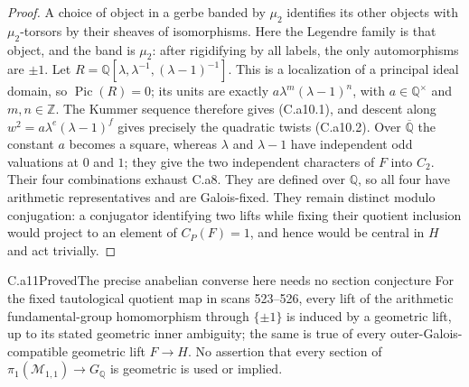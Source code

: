 \begin{proof}
A choice of object in a gerbe banded by $\mu_2$ identifies its other
objects with $\mu_2$-torsors by their sheaves of isomorphisms. Here the
Legendre family is that object, and the band is $\mu_2$: after rigidifying
by all labels, the only automorphisms are $\pm1$. Let
$R=\mathbb Q[\lambda,\lambda^{-1},(\lambda-1)^{-1}]$. This is a
localization of a principal ideal domain, so $\operatorname{Pic}(R)=0$;
its units are exactly $a\lambda^m(\lambda-1)^n$, with
$a\in\mathbb Q^{\times}$ and $m,n\in\mathbb Z$. The Kummer sequence
therefore gives (C.a10.1), and descent along $w^2=a\lambda^e
(\lambda-1)^f$ gives precisely the quadratic twists (C.a10.2).
Over $\overline{\mathbb Q}$ the constant $a$ becomes a square, whereas
$\lambda$ and $\lambda-1$ have independent odd valuations at $0$ and
$1$; they give the two independent characters of $F$ into $C_2$.
Their four combinations exhaust C.a8. They are defined over $\mathbb Q$,
so all four have arithmetic representatives and are Galois-fixed.
They remain distinct modulo conjugation: a conjugator identifying two
lifts while fixing their quotient inclusion would project to an element
of $C_P(F)=1$, and hence would be central in $H$ and act trivially.
\end{proof}

\begin{claim}{C.a11}{Proved}{The precise anabelian converse here needs no section conjecture}
For the fixed tautological quotient map in scans 523--526, every lift of
the arithmetic fundamental-group homomorphism through $\{\pm1\}$ is
induced by a geometric lift, up to its stated geometric inner ambiguity;
the same is true of every outer-Galois-compatible geometric lift
$F\to H$. No assertion that every section of
$\pi_1(\mathcal M_{1,1})\to G_{\mathbb Q}$ is geometric is used or
implied.
\end{claim}

